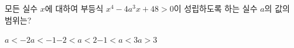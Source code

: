 모든 실수 $x$에 대하여 부등식 $x^4-4a^3x+48>0$이 성립하도록 하는 실수 $a$의 값의 범위는?
\begin{choices32}{$a<-2$}{$a<-1$}{$-2<a<2$}{$-1<a<3$}{$a>3$}\end{choices32}
